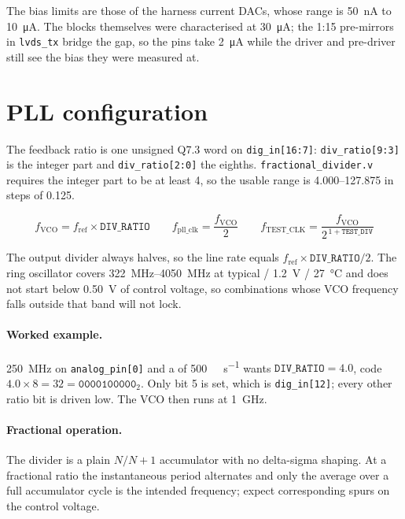 \documentclass[a4paper,10pt]{article}
\newcommand{\net}[1]{\texttt{#1}}
\begin{document}
\noindent
The bias limits are those of the harness current DACs, whose range is
\SI{50}{\nano\ampere} to \SI{10}{\micro\ampere}. The blocks themselves were characterised at
\SI{30}{\micro\ampere}; the 1:15 pre-mirrors in \net{lvds\_tx} bridge the gap,
so the pins take \SI{2}{\micro\ampere} while the driver and pre-driver still see
the bias they were measured at.

\section{PLL configuration}\label{sec:pll}

The feedback ratio is one unsigned Q7.3 word on \net{dig\_in[16:7]}:
\net{div\_ratio[9:3]} is the integer part and \net{div\_ratio[2:0]} the eighths.
\texttt{fractional\_divider.v} requires the integer part to be at least 4, so
the usable range is \numrange{4.000}{127.875} in steps of \num{0.125}.

\begin{equation*}
  f_{\mathrm{VCO}} = f_{\mathrm{ref}} \times \mathtt{DIV\_RATIO}
  \qquad
  f_{\mathrm{pll\_clk}} = \frac{f_{\mathrm{VCO}}}{2}
  \qquad
  f_{\mathrm{TEST\_CLK}} = \frac{f_{\mathrm{VCO}}}{2^{\,1+\mathtt{TEST\_DIV}}}
\end{equation*}

\noindent
The output divider always halves, so the line rate equals
$f_{\mathrm{ref}} \times \mathtt{DIV\_RATIO} / 2$. The ring oscillator covers
\SIrange{322}{4050}{\mega\hertz} at typical / \SI{1.2}{\volt} /
\SI{27}{\celsius} and does not start below \SI{0.50}{\volt} of control voltage,
so combinations whose VCO frequency falls outside that band will not lock.

\paragraph{Worked example.} \SI{250}{\mega\hertz} on \net{analog\_pin[0]} and a
of \SI{500}{\mega\bit\per\second} wants $\mathtt{DIV\_RATIO} = 4.0$, code
$4.0 \times 8 = 32 = \mathtt{0000100000}_2$. Only bit 5 is set, which is
\net{dig\_in[12]}; every other ratio bit is driven low. The VCO then runs at
\SI{1}{\giga\hertz}.

\paragraph{Fractional operation.} The divider is a plain $N/N{+}1$ accumulator
with no delta-sigma shaping. At a fractional ratio the instantaneous period
alternates and only the average over a full accumulator cycle is the intended
frequency; expect corresponding spurs on the control voltage.
\end{document}
